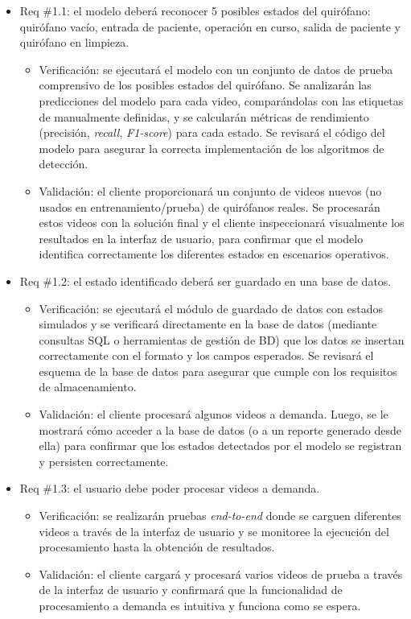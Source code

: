 \documentclass[
11pt, %
]{charter}
\begin{document}
\begin{itemize}
	
	\item Req \#1.1: el modelo deberá reconocer 5 posibles estados del quirófano: quirófano vacío, entrada de paciente, operación en curso, salida de paciente y quirófano en limpieza.
	
	\begin{itemize}
		\item Verificación: se ejecutará el modelo con un conjunto de datos de prueba comprensivo de los posibles estados del quirófano. Se analizarán las predicciones del modelo para cada video, comparándolas con las etiquetas de manualmente definidas, y se calcularán métricas de rendimiento (precisión, \textit{recall}, \textit{F1-score}) para cada estado. Se revisará el código del modelo para asegurar la correcta implementación de los algoritmos de detección.
		\item Validación: el cliente proporcionará un conjunto de videos nuevos (no usados en entrenamiento/prueba) de quirófanos reales. Se procesarán estos videos con la solución final y el cliente inspeccionará visualmente los resultados en la interfaz de usuario, para confirmar que el modelo identifica correctamente los diferentes estados en escenarios operativos.
	\end{itemize}
	
	\item Req \#1.2: el estado identificado deberá ser guardado en una base de datos.
	\begin{itemize}
		\item Verificación: se ejecutará el módulo de guardado de datos con estados simulados y se verificará directamente en la base de datos (mediante consultas SQL o herramientas de gestión de BD) que los datos se insertan correctamente con el formato y los campos esperados. Se revisará el esquema de la base de datos para asegurar que cumple con los requisitos de almacenamiento.
		\item Validación: el cliente procesará algunos videos a demanda. Luego, se le mostrará cómo acceder a la base de datos (o a un reporte generado desde ella) para confirmar que los estados detectados por el modelo se registran y persisten correctamente.
	\end{itemize}
	
	\item Req \#1.3: el usuario debe poder procesar videos a demanda.
	\begin{itemize}
		\item Verificación: se realizarán pruebas \textit{end-to-end} donde se carguen diferentes videos a través de la interfaz de usuario y se monitoree la ejecución del procesamiento hasta la obtención de resultados. 
		\item Validación: el cliente cargará y procesará varios videos de prueba a través de la interfaz de usuario y confirmará que la funcionalidad de procesamiento a demanda es intuitiva y funciona como se espera.
	\end{itemize}
	

\end{itemize}
\end{document}
